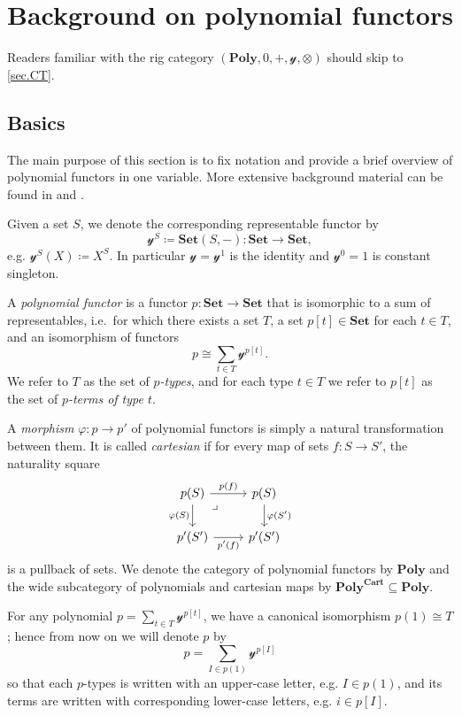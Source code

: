 \documentclass[11pt, one side, article]{memoir}
\theoremstyle{definition}
\theoremstyle{plain}
\newenvironment{definition}
  {\pushQED{\qed}\renewcommand{\qedsymbol}{$\lozenge$}\definitionx}
  {\popQED\enddefinitionx}
\renewcommand{\ss}{\subseteq}
\newcommand{\Cat}[1]{\mathbf{#1}}%
\newcommand{\smset}{\Cat{Set}}
\newcommand{\yon}{\mathcal{y}}
\newcommand{\poly}{\Cat{Poly}}
\newcommand{\polycart}{\poly^{\Cat{Cart}}}
\newcommand{\0}{\textsf{0}}
\newcommand{\1}{\tn{\textsf{1}}}
\begin{document}
\chapter{Background on polynomial functors}\label{chap.background}

Readers familiar with the rig category $(\poly,0,+,\yon,\otimes)$ should skip to \cref{sec.CT}.

\section{Basics}


The main purpose of this section is to fix notation and provide a brief overview of polynomial functors in one variable. More extensive background material can be found in \cite{spivak2022poly} and \cite{kock2012polynomial}. 

\begin{definition}[Polynomial functor]\label{def.poly}
Given a set $S$, we denote the corresponding representable functor by
\[\yon^S\coloneqq\smset(S,-)\colon\smset\to\smset,\]
e.g. $\yon^S(X)\coloneqq X^S$. In particular $\yon=\yon^1$ is the identity and $\yon^0=1$ is constant singleton.

A \emph{polynomial functor} is a functor $p\colon\smset\to\smset$ that is isomorphic to a sum of representables, i.e.\ for which there exists a set $T$, a set $p[t]\in\smset$ for each $t\in T$, and an isomorphism of functors
\[
p\cong\sum_{t\in T}\yon^{p[t]}.
\]
We refer to $T$ as the set of \emph{$p$-types}, and for each type $t\in T$ we refer to $p[t]$ as the set of \emph{$p$-terms of type $t$}.%

A \emph{morphism} $\varphi\colon p\to p'$ of polynomial functors is simply a natural transformation between them. It is called \emph{cartesian} if for every map of sets $f\colon S\to S'$, the naturality square
\[
\begin{tikzcd}
  p(S)\ar[r, "p(f)"]\ar[d, "\varphi(S)"']&p(S)\ar[d, "\varphi(S')"]\\
  p'(S')\ar[r, "p'(f)"']&p'(S')\ar[ul, phantom, very near end, "\lrcorner"]
\end{tikzcd}
\]
is a pullback of sets. We denote the category of polynomial functors by $\poly$ and the wide subcategory of polynomials and cartesian maps by $\polycart\ss\poly$.\end{definition}

For any polynomial $p=\sum_{t\in T}\yon^{p[t]}$, we have a canonical isomorphism $p(1)\cong T$; hence from now on we will denote $p$ by
\begin{equation}\label{eqn.poly_notation}
p=\sum_{I\in p(1)}\yon^{p[I]}
\end{equation}
so that each $p$-types is written with an upper-case letter, e.g. $I\in p(1)$, and its terms are written with corresponding lower-case letters, e.g. $i\in p[I]$.
\end{document}
